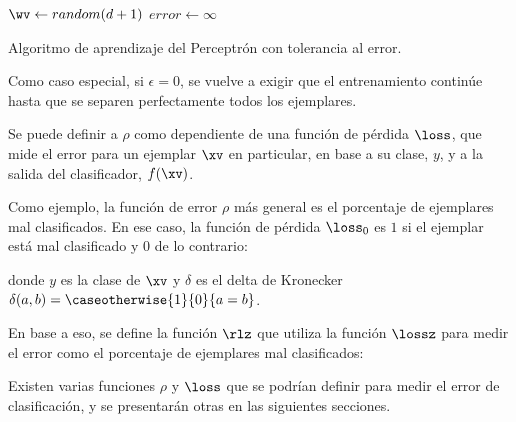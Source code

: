 \begin{algorithm}[H]
$\wv \leftarrow random(d+1)$\;
$error \leftarrow \infty$\;
\caption{Algoritmo de aprendizaje del Perceptrón con tolerancia al error.} 
\end{algorithm}
\vspace{10pt}

Como caso especial, si $\epsilon=0$, se vuelve a exigir que el entrenamiento continúe hasta que se separen perfectamente todos los ejemplares.

Se puede definir a $\rho$ como dependiente de una función de pérdida $\loss$, que mide el error para un ejemplar $\xv$ en particular, en base a su clase, $y$, y a la salida del clasificador, $f(\xv)$.  

Como ejemplo, la función de error $\rho$ más general es el porcentaje de ejemplares mal clasificados. En ese caso, la función de pérdida $\loss_0$ es $1$ si el ejemplar está mal clasificado y $0$ de lo contrario:

donde $y$ es la clase de $\xv$ y $\delta$ es el delta de Kronecker $\delta(a,b)= \caseotherwise{1}{0}{a=b}$. 

En base a eso, se define la función $\rlz$ que utiliza la función $\lossz$ para medir el error como el porcentaje de ejemplares mal clasificados:

Existen varias funciones $\rho$ y $\loss$ que se podrían definir para medir el error de clasificación, y se presentarán otras en las siguientes secciones. 